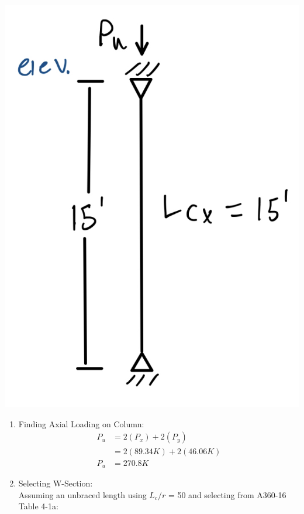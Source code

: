 \documentclass{report} %
\begin{document}
\begin{center}
    \includegraphics[scale=0.15]{RoofColumn_B7_Loads}
\end{center}
\begin{enumerate}
    \item Finding Axial Loading on Column:
        \begin{equation*}
            \begin{aligned}
                P_u &= 2(P_x) + 2(P_y) \\
                    &= 2(89.34K) + 2(46.06K) \\
                P_u &= 270.8K  
            \end{aligned}
        \end{equation*}
    \item Selecting W-Section:\\
        Assuming an unbraced length using $L_c/r$ = 50 and selecting from A360-16 Table 4-1a:
            \begin{center}
            \end{center}    
\end{enumerate}
\end{document}
